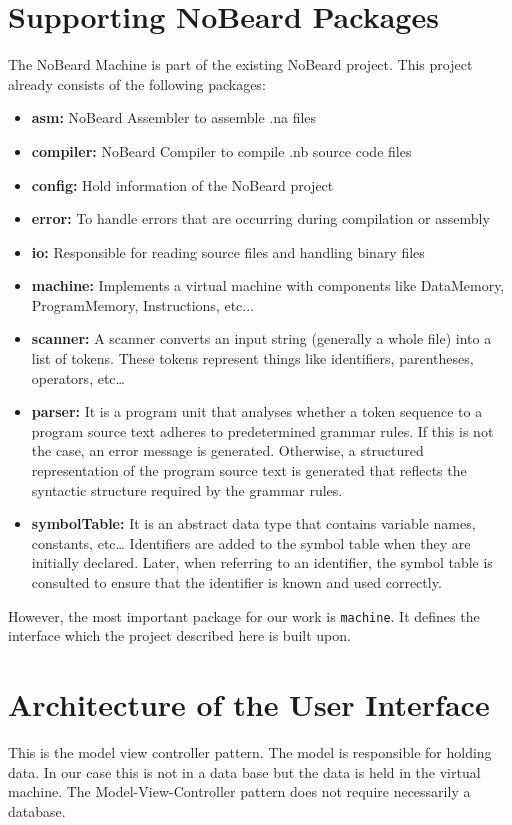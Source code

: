 \section{Supporting NoBeard Packages}
The NoBeard Machine is part of the existing NoBeard project. This project already consists of the following packages:
\begin{itemize}
\item \textbf{asm: }NoBeard Assembler to assemble .na files 
\item \textbf{compiler: }NoBeard Compiler to compile .nb source code files
\item \textbf{config: }Hold information of the NoBeard project
\item \textbf{error: }To handle errors that are occurring during compilation or assembly   
\item \textbf{io: }Responsible for reading source files and handling binary files 
\item \textbf{machine: }Implements a virtual machine with components like DataMemory, ProgramMemory, Instructions, etc...  
\item \textbf{scanner: }A scanner converts an input string (generally a whole file) into a list of tokens. These tokens represent things like identifiers, parentheses, operators, etc\ldots
\item \textbf{parser: }It is a program unit that analyses whether a token sequence to a program source text adheres to predetermined grammar rules. If this is not the case, an error message is generated. Otherwise, a structured representation of the program source text is generated that reflects the syntactic structure required by the grammar rules.
\item \textbf{symbolTable: }It is an abstract data type that contains variable names, constants, etc\ldots  
Identifiers are added to the symbol table when they are initially declared. Later, when referring to an identifier, the symbol table is consulted to ensure that the identifier is known and used correctly.
\end{itemize}
However, the most important package for our work is \lstinline$machine$. It defines the interface which the project described here is built upon.
\section{Architecture of the User Interface}
This is the model view controller pattern. The model is responsible for holding data. In our case this is not in a data base but the data is held in the virtual machine. The Model-View-Controller pattern does not require necessarily a database.

